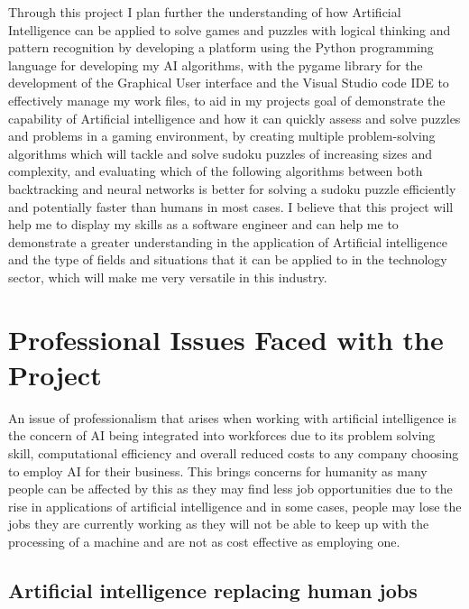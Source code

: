 \documentclass[]{final_report}
\begin{document}
Through this project I plan further the understanding of how Artificial Intelligence can be applied to solve games and puzzles with logical thinking and pattern recognition by developing a platform using the Python programming language for developing my AI algorithms, with the pygame library for the development of the Graphical User interface and the Visual Studio code IDE to effectively manage my work files, to aid in my projects goal of demonstrate the capability of Artificial intelligence and how it can quickly assess and solve puzzles and problems in a gaming environment, by creating multiple problem-solving algorithms which will tackle and solve sudoku puzzles of increasing sizes and complexity, and evaluating which of the following algorithms between both backtracking and neural networks is better  for solving a sudoku puzzle efficiently and potentially faster than humans in most cases. I believe that this project will help me to display my skills as a software engineer and can help me to demonstrate a greater understanding in the application of Artificial intelligence and the type of fields and situations that it can be applied to in the technology sector, which will make me very versatile in this industry. 

\section{Professional Issues Faced with the Project}

An issue of professionalism that arises when working with artificial intelligence is the concern of AI being integrated into workforces due to its problem solving skill, computational efficiency and overall reduced costs to any company choosing to employ AI for their business. This brings concerns for humanity as many people can be affected by this as they may find less job opportunities due to the rise in applications of artificial intelligence and in some cases, people may lose the jobs they are currently working as they will not be able to keep up with the processing of a machine and are not as cost effective as employing one. 

\subsection{Artificial intelligence replacing human jobs} 
\end{document}
